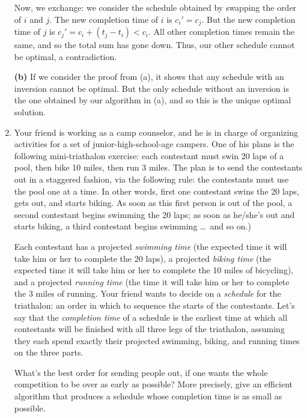 \documentclass[12pt]{article}
\begin{document}
\begin{enumerate}
{Now, we exchange: we consider the schedule obtained by
swapping the order of $i$ and $j$.
The new completion time of $i$ is $c_i' = c_j$.
But the new completion time of $j$ is 
$c_j' = c_i + (t_j - t_i) < c_i$.
All other completion times remain the same, and so
the total sum has gone down.
Thus, our other schedule cannot be optimal, a contradiction.

{\bf (b)} If we consider the proof from (a), it shows 
that any schedule with an inversion cannot be optimal.
But the only schedule without an inversion is the one
obtained by our algorithm in (a), and so this
is the unique optimal solution.

}


\item 

Your friend is working as a camp counselor, and he
is in charge of organizing activities for a set of
junior-high-school-age campers.
One of his plans is the following mini-triathalon exercise:
each contestant must swin 20 laps of a pool, then bike 10 miles,
then run 3 miles.
The plan is to send the contestants out in a staggered fashion,
via the following rule: the contestants must use the pool
one at a time.
In other words, first one contestant swins the 20 laps,
gets out, and starts biking.
As soon as this first person is out of the pool,
a second contestant begins swimming the 20 laps;
as soon as he/she's out and starts biking, a third
contestant begins swimming \ldots\ and so on.)

Each contestant has a projected {\em swimming time}
(the expected time it will take him or her to complete the 20 laps),
a projected {\em biking time}
(the expected time it will take him or her to complete the
10 miles of bicycling),
and a projected {\em running time}
(the time it will take him or her to complete the 3 miles of running.
Your friend wants to decide on a {\em schedule} for the triathalon:
an order in which to sequence the starts of the contestants.
Let's say that the {\em completion time} of a schedule
is the earliest time at which all contestants will be finished
with all three legs of the triathalon,
assuming they each spend exactly their projected
swimming, biking, and running times on the three parts.

What's the best order for sending people out, if
one wants the whole competition to be over as early as possible?
More precisely, give an efficient algorithm that produces a schedule
whose completion time is as small as possible.


\end{enumerate}
\end{document}
